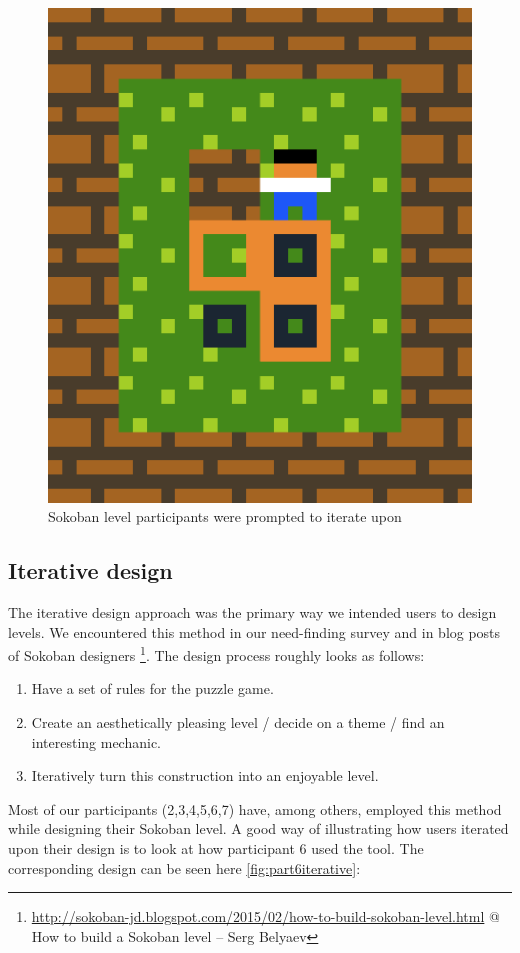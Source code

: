 \begin{figure}
\centering
\includegraphics[width=0.5\linewidth]{figures/sokobaniteratelevel.png}
\caption[SokobanIterate]{Sokoban level participants were prompted to iterate upon\label{fig:sokobaniterate}}
\end{figure}



\subsection{Iterative design}

The iterative design approach was the primary way we intended users to design levels. We encountered this method in our need-finding survey and in blog posts of Sokoban designers \footnote{\url{http://sokoban-jd.blogspot.com/2015/02/how-to-build-sokoban-level.html} @ How to build a Sokoban level -- Serg Belyaev}. The design process roughly looks as follows:

\begin{enumerate}
\item Have a set of rules for the puzzle game.
\item Create an aesthetically pleasing level / decide on a
theme / find an interesting mechanic.
\item Iteratively turn this construction into an enjoyable level.
\end{enumerate}

Most of our participants (2,3,4,5,6,7) have, among others, employed this method while designing their Sokoban level.
A good way of illustrating how users iterated upon their design is to look at how participant 6 used the tool. The corresponding design can be seen here \ref{fig:part6iterative}:

